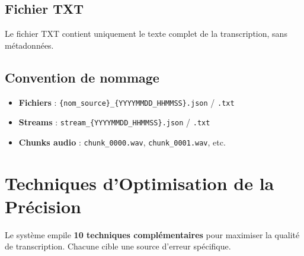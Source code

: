 \documentclass[12pt,a4paper]{report}
\begin{document}
\section{Fichier TXT}

Le fichier TXT contient uniquement le texte complet de la transcription, sans métadonnées.

\section{Convention de nommage}

\begin{itemize}
    \item \textbf{Fichiers} : \texttt{\{nom\_source\}\_\{YYYYMMDD\_HHMMSS\}.json} / \texttt{.txt}
    \item \textbf{Streams} : \texttt{stream\_\{YYYYMMDD\_HHMMSS\}.json} / \texttt{.txt}
    \item \textbf{Chunks audio} : \texttt{chunk\_0000.wav}, \texttt{chunk\_0001.wav}, etc.
\end{itemize}

\chapter{Techniques d'Optimisation de la Précision}

Le système empile \textbf{10 techniques complémentaires} pour maximiser la qualité de transcription. Chacune cible une source d'erreur spécifique.
\end{document}
